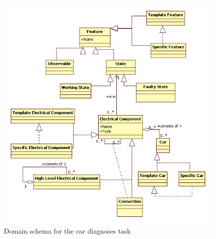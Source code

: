 \documentclass[a4paper,10pt]{article}
\begin{document}
\begin{figure}[htbp]
	\centering
		\includegraphics[width=1.00\textwidth]{DomainSchema.jpg}
	\caption{Domain schema for the car diagnoses task}
	\label{fig:DS}
\end{figure}
\end{document}

